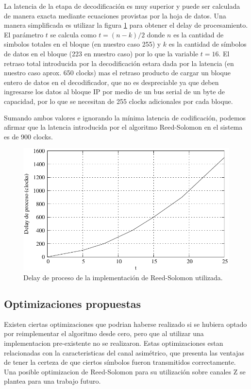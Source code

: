 La latencia de la etapa de decodificación es muy superior y puede ser calculada de manera exacta mediante ecuaciones provistas por la hoja de datos. Una manera simplificada es utilizar la figura \ref{fig_rslat} para obtener el delay de procesamiento. El parámetro $t$ se calcula como $t=(n-k)/2$ donde $n$ es la cantidad de simbolos totales en el bloque (en nuestro caso 255) y $k$ es la cantidad de símbolos de datos en el bloque (223 en nuestro caso) por lo que la variable $t=16$.  El retraso total introducida por la decodificación estara dada por la latencia (en nuestro caso aprox. 650 clocks) mas el retraso producto de cargar un bloque entero de datos en el decodificador, que no es despreciable ya que deben ingresarse los datos al bloque IP por medio de un bus serial de un byte de capacidad, por lo que se necesitan de 255 clocks adicionales por cada bloque. 

Sumando ambos valores e ignorando la mínima latencia de codificación, podemos afirmar que la latencia introducida por el algoritmo Reed-Solomon en el sistema es de 900 clocks.

\begin{figure}[t]
  \centering
  \includegraphics[width=0.6 \textwidth]{graphs/rsDelay.pdf} 
  \caption{Delay de proceso de la implementación de Reed-Solomon utilizada.}
  \label{fig_rslat}
\end{figure}


\subsection{Optimizaciones propuestas}
 
Existen ciertas optimizaciones que podrian haberse realizado si se hubiera optado por reimplementar el algoritmo desde cero, pero que al utilizar una implementacion pre-existente no se realizaron. Estas optimizaciones estan relacionadas con la caracteristicas del canal asimétrico, que presenta las ventajas de tener la certeza de que ciertos símbolos fueron transmitidos correctamente. Una posible optimizacion de Reed-Solomon para su utilización sobre canales Z se plantea para una trabajo futuro.


